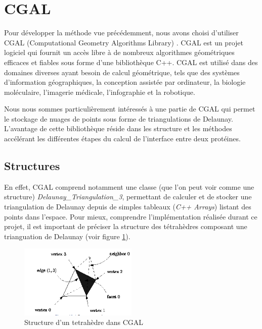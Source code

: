 \section{CGAL}

Pour développer la méthode vue précédemment, nous avons choisi d'utiliser CGAL
(Computational Geometry Algorithms Library) \cite{CGAL}.
CGAL est un projet logiciel qui fournit un accès libre à de nombreux algorithmes géométriques
efficaces et fiables sous forme d'une bibliothèque C++. CGAL est utilisé dans des
domaines diverses ayant besoin de calcul géométrique, tels que des systèmes
d'information géographiques, la conception assistée par ordinateur, la biologie
moléculaire, l'imagerie médicale, l'infographie et la robotique.

Nous nous sommes particulièrement intéressés à une partie de CGAL qui permet le
stockage de nuages de points sous forme de triangulations de Delaunay. L'avantage
de cette bibliothèque réside dans les structure et les méthodes accélérant les différentes
étapes du calcul de l'interface entre deux protéines.

\subsection*{Structures}


En effet, CGAL comprend notamment une classe (que l'on peut voir comme une structure)
\textit{Delaunay\_Triangulation\_3},
permettant de calculer et de stocker une triangulation de Delaunay depuis de simples
tableaux (\textit{C++ Arrays}) listant des points dans l'espace. Pour mieux, comprendre
l'implémentation réalisée durant ce projet, il est important de préciser la structure des tétrahèdres
composant une trianguation de Delaunay (voir figure \ref{fig::tetrahedron_cgal}).

\begin{figure}[ht]
\centering
  \includegraphics[width=0.5\textwidth]{figures/tetrahedron_cgal.png}
  \caption{Structure d'un tetrahèdre dans CGAL}
  \label{fig::tetrahedron_cgal}
\end{figure}

